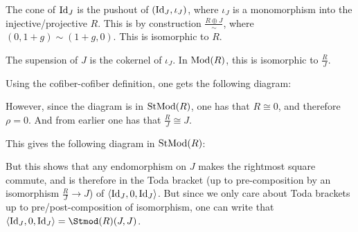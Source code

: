 The cone of \( \operatorname{Id}_J \) is the pushout of \( (\operatorname{Id}_J, \iota_J) \), where \( \iota_J \) is a monomorphism into the injective/projective \( R \). This is by construction \( \frac{R \oplus J}{\sim} \), where \( (0, 1+g) \sim (1+g, 0) \). This is isomorphic to \( R \).

The supension of \( J \) is the cokernel of \( \iota_J \). In \( \operatorname{Mod}(R) \), this is isomorphic to \( \frac{R}{J} \).

Using the cofiber-cofiber definition, one gets the following diagram:

\begin{center}
\end{center}

However, since the diagram is in \( \operatorname{StMod}(R) \), one has that \( R \cong 0 \), and therefore \( \rho = 0 \). And from earlier one has that \( \frac{R}{J} \cong J \).

This gives the following diagram in \( \operatorname{StMod}(R) \):

\begin{center}
\end{center}

But this shows that any endomorphism on \( J \) makes the rightmost square commute, and is therefore in the Toda bracket (up to pre-composition by an isomorphism \( \frac{R}{J} \to J \)) of \( \langle \operatorname{Id}_J, 0, \operatorname{Id}_J \rangle \). But since we only care about Toda brackets up to pre/post-composition of isomorphism, one can write that \( \toda{\Id_J, 0, \Id_J} = \Stmod(R)(J, J) \).

